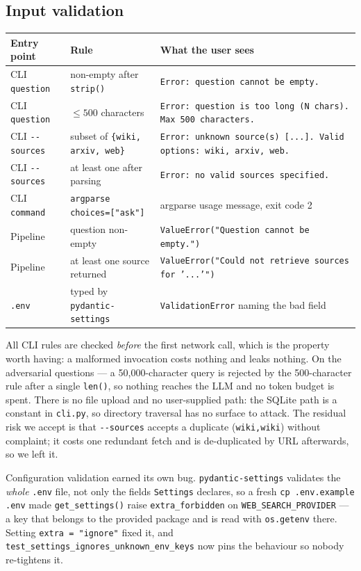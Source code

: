 \documentclass[11pt,a4paper]{article}
\begin{document}
\subsection{Input validation}

\begin{center}\small
\begin{tabularx}{\textwidth}{@{}llX@{}}
\toprule
\textbf{Entry point} & \textbf{Rule} & \textbf{What the user sees} \\
\midrule
CLI \texttt{question} & non-empty after \texttt{strip()} & \texttt{Error: question cannot be empty.} \\
CLI \texttt{question} & $\le 500$ characters & \texttt{Error: question is too long (N chars). Max 500 characters.} \\
CLI \texttt{-{}-sources} & subset of \texttt{\{wiki, arxiv, web\}} & \texttt{Error: unknown source(s) [...]. Valid options: wiki, arxiv, web.} \\
CLI \texttt{-{}-sources} & at least one after parsing & \texttt{Error: no valid sources specified.} \\
CLI \texttt{command} & \texttt{argparse} \texttt{choices=["ask"]} & argparse usage message, exit code 2 \\
Pipeline & question non-empty & \texttt{ValueError("Question cannot be empty.")} \\
Pipeline & at least one source returned & \texttt{ValueError("Could not retrieve sources for '...'")} \\
\texttt{.env} & typed by \texttt{pydantic-settings} & \texttt{ValidationError} naming the bad field \\
\bottomrule
\end{tabularx}
\end{center}

All CLI rules are checked \emph{before} the first network call, which is the property worth
having: a malformed invocation costs nothing and leaks nothing. On the adversarial questions ---
a 50{,}000-character query is rejected by the 500-character rule after a single \texttt{len()},
so nothing reaches the LLM and no token budget is spent. There is no file upload and no
user-supplied path: the SQLite path is a constant in \texttt{cli.py}, so directory traversal has
no surface to attack. The residual risk we accept is that
\texttt{-{}-sources} accepts a duplicate (\texttt{wiki,wiki}) without complaint; it costs one
redundant fetch and is de-duplicated by URL afterwards, so we left it.

Configuration validation earned its own bug. \texttt{pydantic-settings} validates the
\emph{whole} \texttt{.env} file, not only the fields \texttt{Settings} declares, so a fresh
\texttt{cp .env.example .env} made \texttt{get\_settings()} raise
\texttt{extra\_forbidden} on \texttt{WEB\_SEARCH\_PROVIDER} --- a key that belongs to the
provided package and is read with \texttt{os.getenv} there. Setting \texttt{extra = "ignore"}
fixed it, and \texttt{test\_settings\_ignores\_unknown\_env\_keys} now pins the behaviour so
nobody re-tightens it.
\end{document}
